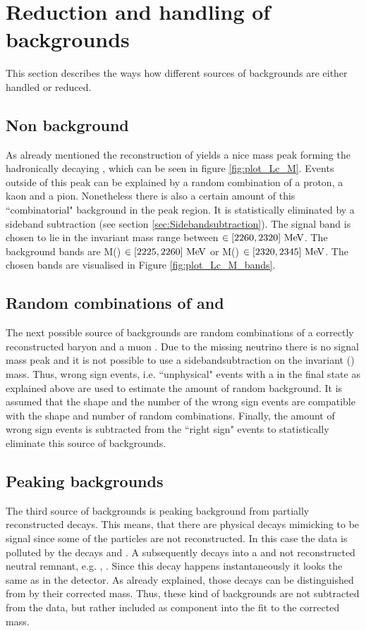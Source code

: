 \section{Reduction and handling of backgrounds}
This section describes the ways how different sources of backgrounds are either handled or reduced.

\subsection{Non \Lc background}
As already mentioned the reconstruction of \pKpi yields a nice mass peak forming the hadronically decaying \Lc, which can be seen in figure \ref{fig:plot_Lc_M}. 
Events outside of this peak can be explained by a random combination of a proton, a kaon and a pion.
Nonetheless there is also a certain amount of this ``combinatorial" background in the peak region.
It is statistically eliminated by a sideband subtraction (see section \ref{sec:Sidebandsubtraction}).
The signal band is chosen to lie in the invariant \pKpi mass range between $\in \left[2260, 2320\right]\mathrm{\,Me\kern -0.1em V}$.
The background bands are M(\pKpi) $\in \left[2225, 2260\right]\mathrm{\,Me\kern -0.1em V}$ or M(\pKpi) $\in \left[2320, 2345\right]\mathrm{\,Me\kern -0.1em V}$.
The chosen bands are visualised in Figure \ref{fig:plot_Lc_M_bands}.

\subsection{Random combinations of \Lc and \mun}
The next possible source of backgrounds are random combinations of a correctly reconstructed \Lc baryon and a muon \mun. 
Due to the missing neutrino \neumb there is no signal mass peak and it is not possible to use a sidebandsubtraction on the invariant \pKpi\mun (\Lc\mun) mass.
Thus, wrong sign events, i.e. ``unphysical" events with a \Lc\mup in the final state as explained above are used to estimate the amount of random \Lc\mun background.
It is assumed that the shape and the number of the wrong sign events are compatible with the shape and number of random \Lc\mun combinations.
Finally, the amount of wrong sign events is subtracted from the ``right sign" events to statistically eliminate this source of backgrounds.

\subsection{Peaking backgrounds}
The third source of backgrounds is peaking background from partially reconstructed decays.
This means, that there are physical decays mimicking to be signal since some of the particles are not reconstructed.
In this case the \LbToLcmunu data is polluted by the decays  and  \cite{SL_Vub}.
A \Lcstar subsequently decays into a \Lc and not reconstructed neutral remnant, e.g. \piz, \pip\pim.
Since this decay happens instantaneously it looks the same as \LcTopKpi in the detector.
As already explained, those decays can be distinguished from \LbToLcmunu by their corrected \Lb mass.
Thus, these kind of backgrounds are not subtracted from the data, but rather included as component into the fit to the corrected \Lb mass.


